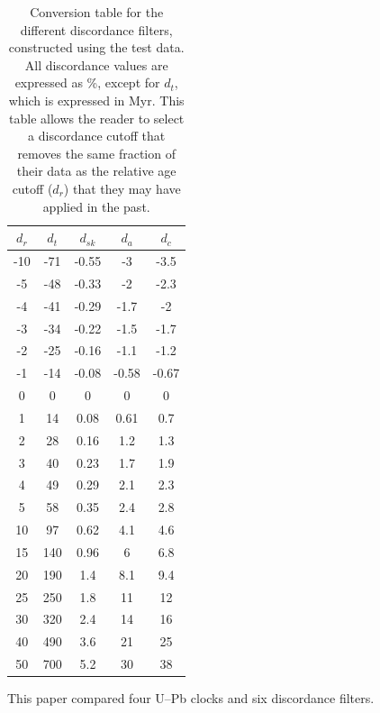 \documentclass[gchron, manuscript]{copernicus}
\begin{document}
\begin{table}
  \begin{tabular}{c|cccc}
    $d_r$ & $d_t$ & $d_{sk}$ & $d_a$ & $d_c$ \\ \hline
    -10 & -71 & -0.55 & -3 & -3.5 \\ 
    -5 & -48 & -0.33 & -2 & -2.3 \\ 
    -4 & -41 & -0.29 & -1.7 & -2 \\ 
    -3 & -34 & -0.22 & -1.5 & -1.7 \\ 
    -2 & -25 & -0.16 & -1.1 & -1.2 \\ 
    -1 & -14 & -0.08 & -0.58 & -0.67 \\ 
    0 & 0 & 0 & 0 & 0 \\ 
    1 & 14 & 0.08 & 0.61 & 0.7 \\ 
    2 & 28 & 0.16 & 1.2 & 1.3 \\ 
    3 & 40 & 0.23 & 1.7 & 1.9 \\ 
    4 & 49 & 0.29 & 2.1 & 2.3 \\ 
    5 & 58 & 0.35 & 2.4 & 2.8 \\ 
    10 & 97 & 0.62 & 4.1 & 4.6 \\ 
    15 & 140 & 0.96 & 6 & 6.8 \\ 
    20 & 190 & 1.4 & 8.1 & 9.4 \\ 
    25 & 250 & 1.8 & 11 & 12 \\ 
    30 & 320 & 2.4 & 14 & 16 \\ 
    40 & 490 & 3.6 & 21 & 25 \\ 
    50 & 700 & 5.2 & 30 & 38 \\ 
  \end{tabular}
  \caption{Conversion table for the different discordance filters,
    constructed using the test data. All discordance values are
    expressed as \%, except for $d_t$, which is expressed in Myr. This
    table allows the reader to select a discordance cutoff that
    removes the same fraction of their data as the relative age cutoff
    ($d_r$) that they may have applied in the past. }
  \label{tab:conversiontable}
\end{table}

\conclusions
\label{sec:conclusions}

This paper compared four U--Pb clocks and six discordance filters.
\end{document}
